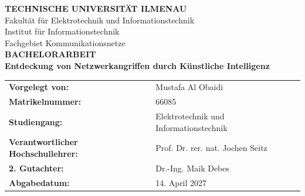 \documentclass[12pt, a4paper, ngerman]{scrreprt}
\newcommand{\myTitel}{Entdeckung von Netzwerkangriffen durch Künstliche Intelligenz}
\newcommand{\myAutor}{Mustafa Al Obaidi}
\newcommand{\myMatrikelnr}{66085}
\newcommand{\myStudiengang}{Elektrotechnik und Informationstechnik}
\newcommand{\myErstpruefer}{Prof. Dr. rer. nat. Jochen Seitz}
\newcommand{\myZweitpruefer}{Dr.-Ing. Maik Debes}
\newcommand{\myAbgabedatum}{14. April 2027}
\begin{document}
\setcounter{page}{0}
\begin{titlepage}
    \centering
    \vspace*{1cm}
    {\Large \textbf{TECHNISCHE UNIVERSITÄT ILMENAU}}\\[0.4cm]
    {\large Fakultät für Elektrotechnik und Informationstechnik}\\[0.2cm]
    {\large Institut für Informationstechnik}\\[0.2cm]
    {\large Fachgebiet Kommunikationsnetze}\\[1.5cm]

    {\Large \textbf{BACHELORARBEIT}}\\[1.5cm]

    {\huge \textbf{\myTitel}}\\[2cm]

    \vfill

    \begin{tabular}{ll}
        \textbf{Vorgelegt von:} & \myAutor \\[0.2cm]
        \textbf{Matrikelnummer:} & \myMatrikelnr \\[0.2cm]
        \textbf{Studiengang:} & \myStudiengang \\[0.6cm]
        \textbf{Verantwortlicher Hochschullehrer:} & \myErstpruefer \\[0.2cm]
        \textbf{2. Gutachter:} & \myZweitpruefer \\[0.6cm]
        \textbf{Abgabedatum:} & \myAbgabedatum
    \end{tabular}

    \vspace*{1cm}
\end{titlepage}

\clearpage
{}
\setcounter{page}{1}
\tableofcontents
\clearpage
\listoffigures
\clearpage
\listoftables
\clearpage

\clearpage
{}
\setcounter{page}{1}










\printbibliography[heading=bibintoc, title={Literaturverzeichnis}]

\appendix

\end{document}

